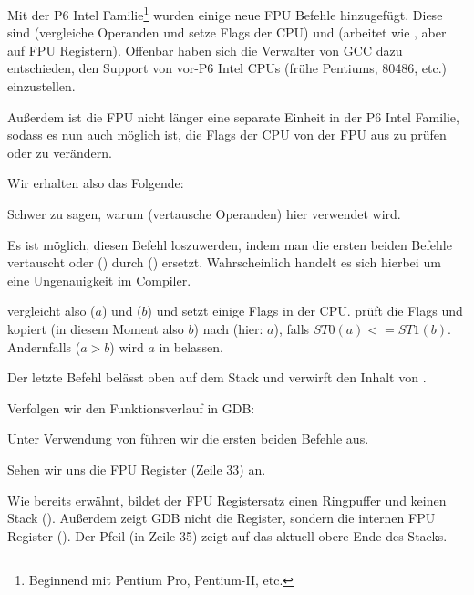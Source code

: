 \label{gcc481_o3}
Mit der P6 Intel Familie\footnote{Beginnend mit Pentium Pro, Pentium-II, etc.}
wurden einige neue FPU Befehle hinzugefügt. 
Diese sind  (vergleiche Operanden und setze Flags der CPU) und 
 (arbeitet wie , aber auf FPU Registern).
Offenbar haben sich die Verwalter von GCC dazu entschieden, den Support von
vor-P6 Intel CPUs (frühe Pentiums, 80486, etc.) einzustellen.

Außerdem ist die FPU nicht länger eine separate Einheit in der P6 Intel Familie,
sodass es nun auch möglich ist, die Flags der CPU von der FPU aus zu prüfen oder
zu verändern.

Wir erhalten also das Folgende:



Schwer zu sagen, warum  (vertausche Operanden) hier verwendet wird.

Es ist möglich, diesen Befehl loszuwerden, indem man die ersten beiden \FLD
Befehle vertauscht oder  () durch 
() ersetzt.
Wahrscheinlich handelt es sich hierbei um eine Ungenauigkeit im Compiler.

 vergleicht also  ($a$) und  ($b$) und setzt einige
Flags in der CPU. 
 prüft die Flags und kopiert  (in diesem Moment also $b$)
nach  (hier: $a$), falls $ST0 (a) <= ST1 (b)$.
Andernfalls ($a>b$) wird $a$ in  belassen.

Der letzte \FSTP Befehl belässt  oben auf dem Stack und verwirft den
Inhalt von . 

Verfolgen wir den Funktionsverlauf in GDB:



Unter Verwendung von  führen wir die ersten beiden \FLD Befehle aus.

Sehen wir uns die FPU Register (Zeile 33) an.

Wie bereits erwähnt, bildet der FPU Registersatz einen Ringpuffer und keinen
Stack ().
Außerdem zeigt GDB nicht die  Register, sondern die internen FPU
Register (). 
Der Pfeil (in Zeile 35) zeigt auf das aktuell obere Ende des Stacks.

